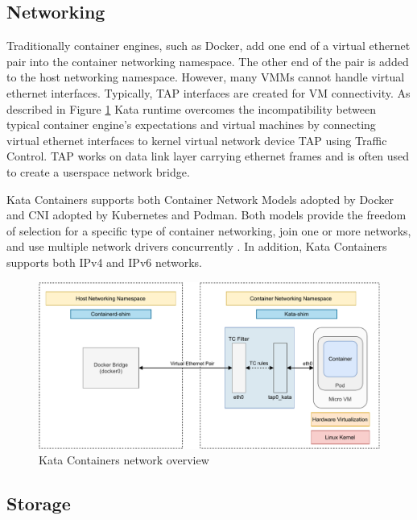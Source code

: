 \subsection{Networking}

Traditionally container engines, such as Docker, add one end of a virtual ethernet pair into the container networking namespace. The other end of the pair is added to the host networking namespace. However, many VMMs cannot handle virtual ethernet interfaces. Typically, TAP interfaces are created for VM connectivity. As described in Figure \ref{fig:KataContainersNetwork} Kata runtime overcomes the incompatibility between typical container engine's expectations and virtual machines by connecting virtual ethernet interfaces to kernel virtual network device TAP using Traffic Control. TAP works on data link layer carrying ethernet frames and is often used to create a userspace network bridge. \cite{KataContainersArchitecture}

Kata Containers supports both Container Network Models adopted by Docker and CNI adopted by Kubernetes and Podman. Both models provide the freedom of selection for a specific type of container networking, join one or more networks, and use multiple network drivers concurrently \cite{Randazzo2019}. In addition, Kata Containers supports both IPv4 and IPv6 networks.

\begin{figure}[ht]
  \begin{center}
    \includegraphics[width=13.5cm]{images/KataContainersNetwork.pdf}
    \caption{Kata Containers network overview \cite{KataContainersArchitecture}}
    \label{fig:KataContainersNetwork}
  \end{center}
\end{figure}

\subsection{Storage}


